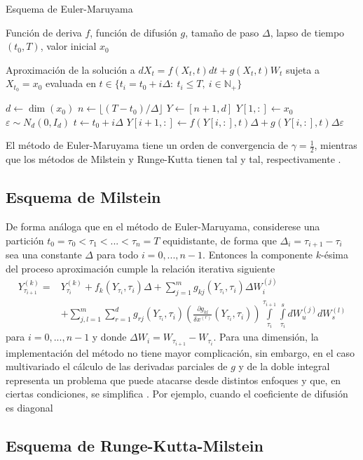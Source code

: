 \begin{algorithm}
\caption{Esquema de Euler-Maruyama}
\label{alg:EM}
\begin{algorithmic}[1]
\vspace{0.2cm}
\Require \parbox[t]{13cm}{
    Función de deriva $f$, función de difusión $g$, tamaño de paso 
    $\Delta$, lapso de tiempo $(t_0,T)$, valor inicial $x_0$
}
\vspace{0.2cm}
\Ensure 
\parbox[t]{13cm}{
    Aproximación de la solución a $dX_t=f(X_t,t)dt+g(X_t,t)W_t$ sujeta a 
    $X_{t_0}=x_0$ evaluada en 
    $t\in\{t_i=t_0 + i\Delta:\ t_i\leq T,\ i\in \mathbb N_+\}$
}
\vspace{0.2cm}
\State $d \leftarrow \dim(x_0)$
\State $n\leftarrow \lfloor(T-t_0)/\Delta\rfloor$
\State $Y \leftarrow [n+1,d]$
\State $Y[1,:]\leftarrow x_0$
    \State $\varepsilon \sim N_d(0, I_d)$
    \State $t\leftarrow t_0+i\Delta$
    \State $Y[i+1,:]\leftarrow f(Y[i,:],t)\Delta+g(Y[i,:],t)\Delta\varepsilon$
\EndFor
\end{algorithmic}
\end{algorithm}

El método de Euler-Maruyama tiene un orden de convergencia de 
$\gamma = \frac{1}{2}$, mientras que los métodos de Milstein y 
Runge-Kutta tienen tal y tal, respectivamente 
\cite{fuchsInferenceDiffusionProcesses2013}.

\subsection{Esquema de Milstein}

De forma análoga que en el método de Euler-Maruyama,
considerese una partición $t_0=\tau_0<\tau_1<...<\tau_n=T$
equidistante, de forma que $\Delta_i=\tau_{i+1}-\tau_{i}$ 
sea una constante $\Delta$ para todo $i=0,...,n-1$. 
Entonces la componente $k$-ésima del proceso aproximación 
cumple la relación iterativa siguiente 
\begin{equation}
    \begin{split}
        Y_{\tau_{i+1}}^{(k)}=&Y_{\tau_i}^{(k)}+f_k(Y_{\tau_{i}},\tau_i)\Delta
+ \sum_{j=1}^m g_{kj}(Y_{\tau_i},\tau_i)\Delta W_i^{(j)}\\
&+\sum_{j,l=1}^m\sum_{r=1}^dg_{rj}(Y_{\tau_i},\tau_i)
\left(\frac{\partial g_{kl}}{\delta x^{(r)}}(Y_{\tau_i},\tau_i) 
\right)\int\limits^{\tau_{i+1}}_{\tau_i} \int\limits^s_{\tau_i}dW_u^{(j)}dW_s^{(l)}
    \end{split}
\end{equation}
para $i=0,...,n-1$ y donde $\Delta W_{i}=W_{\tau_{i+1}}-W_{\tau_i}$. Para una 
dimensión, la implementación del método no tiene mayor complicación, 
sin embargo, en el caso multivariado el cálculo de las derivadas parciales 
de $g$ y de la doble integral representa un problema que puede atacarse 
desde distintos enfoques y que, en ciertas condiciones, se simplifica 
\cite{kloedenNumericalSolutionStochastic1992}. Por ejemplo, cuando 
el coeficiente de difusión es diagonal 


\subsection{Esquema de Runge-Kutta-Milstein}
